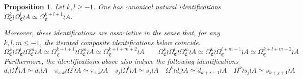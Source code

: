 \documentclass[a4paper,10pt
]{article}%
\numberwithin{equation}{section}
\numberwithin{figure}{section}
\newtheorem{proposition}[equation]{Proposition}%
\theoremstyle{definition} %
\newcommand{\1}{\ensuremath{\mathbbm 1}}%
\begin{document}
\begin{proposition}\label{ASSOCIDS PROP}
	Let $k,l\geq -1$. One has canonical natural identifications 
	$\Omega^k_{\mathfrak{C}} \wr \Omega^l_{\mathfrak{C}} \wr A
	\simeq 
	\Omega^{k+l+1}_{\mathfrak{C}} \wr A $.
	
	Moreover, these identifications are associative in the sense that, for any $k,l,m \leq -1$,
	the iterated composite identifications below coincide.
\[
	\Omega^k_{\mathfrak{C}} \wr \Omega^l_{\mathfrak{C}} \wr \Omega^m_{\mathfrak{C}} \wr A
	\simeq 
	\Omega^{k+l+1}_{\mathfrak{C}} \wr \Omega^m_{\mathfrak{C}} \wr A
	\simeq 
	\Omega^{k+l+m+2}_{\mathfrak{C}} \wr A
	\qquad
	\Omega^k_{\mathfrak{C}} \wr \Omega^l_{\mathfrak{C}} \wr \Omega^m_{\mathfrak{C}} \wr A
	\simeq 
	\Omega^{k}_{\mathfrak{C}} \wr \Omega^{l+m+1}_{\mathfrak{C}} \wr A
	\simeq 
	\Omega^{k+l+m+2}_{\mathfrak{C}} \wr A
\]
	Furthermore, the identifications above also induce the following identifications
	\[
	d_i \wr \Omega^l \wr A \simeq d_i \wr A
	\quad
	\pi_{i,k} \wr \Omega^l \wr A \simeq \pi_{i,k} \wr A
	\quad
	s_j \wr \Omega^l \wr A \simeq s_j \wr A
	\quad
	\Omega^k \wr d_i \wr A \simeq d_{k+i+1} \wr A
	\quad
	\Omega^k \wr s_j \wr A \simeq s_{k+j+1} \wr A
	\]
\end{proposition}
\end{document}
